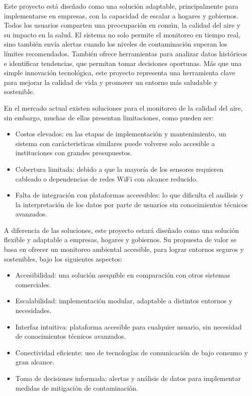 \documentclass[
11pt, %
]{charter}
\begin{document}
Este proyecto está diseñado como una solución adaptable, principalmente para implementarse en empresas, con la capacidad de escalar a hogares y gobiernos. Todos los usuarios comparten una preocupación en común, la calidad del aire y su impacto en la salud. El sistema no solo permite el monitoreo en tiempo real, sino también envía alertas cuando los niveles de contaminación superan los límites recomendados. También ofrece herramientas para analizar datos históricos e identificar tendencias, que permitan tomar decisiones oportunas. Más que una simple innovación tecnológica, este proyecto representa una herramienta clave para mejorar la calidad de vida y promover un entorno más saludable y sostenible.

En el mercado actual existen soluciones para el monitoreo de la calidad del aire, sin embargo, muchas de ellas presentan limitaciones, como pueden ser:
\begin{itemize}
	\item Costos elevados: en las etapas de implementación y mantenimiento, un sistema con carácteristicas similares puede volverse solo accesible a instituciones con grandes presupuestos.
	\item Cobertura limitada: debido a que la mayoría de los sensores requieren cableado o dependencias de redes WiFi con alcance reducido.
	\item Falta de integración con plataformas acceesibles: lo que dificulta el análisis y la interpretación de los datos por parte de usuarios sin conocimientos técnicos avanzados.
\end{itemize}

A diferencia de las soluciones, este proyecto estará diseñado como una solución flexible y adaptable a  empresas, hogares y gobiernos. Su propuesta de valor se basa en ofrecer un monitoreo ambiental accesible, para lograr entornos seguros y sostenibles, bajo los siguientes aspectos:

\begin{itemize}
	\item Accesibilidad: una solución asequible en comparación con otros sistemas comerciales.
	\item Escalabilidad: implementación modular, adaptable a distintos entornos y necesidades.
	\item Interfaz intuitiva: plataforma accesible para cualquier usuario, sin necesidad de conocimientos técnicos avanzados.
	\item Conectividad eficiente: uso de tecnologías de comunicación de bajo consumo y gran alcance.
	\item Toma de decisiones informada: alertas y análisis de datos para implementar medidas de mitigación de contaminación.
\end{itemize}
\end{document}
